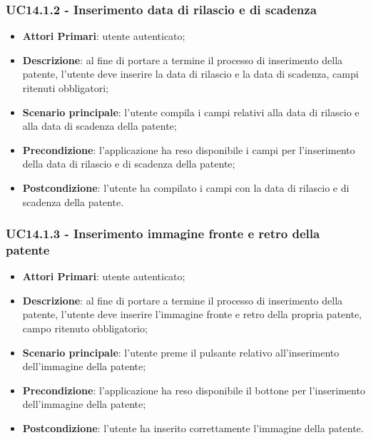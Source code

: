 \subsubsection{UC14.1.2 - Inserimento data di rilascio e di scadenza}
\begin{itemize}
	\item \textbf{Attori Primari}: utente autenticato;
	\item \textbf{Descrizione}: al fine di portare a termine il processo di inserimento della patente, l'utente deve inserire la data di rilascio e la data di scadenza, campi ritenuti obbligatori; 
	\item \textbf{Scenario principale}: l'utente compila i campi relativi alla data di rilascio e alla data di scadenza della patente;	
	\item \textbf{Precondizione}: l'applicazione ha reso disponibile i campi per l'inserimento della data di rilascio e di scadenza della patente;
	\item \textbf{Postcondizione}: l'utente ha compilato i campi con la data di rilascio e di scadenza della patente.
\end{itemize}
\subsubsection{UC14.1.3 - Inserimento immagine fronte e retro della patente}
\begin{itemize}
	\item \textbf{Attori Primari}: utente autenticato;
	\item \textbf{Descrizione}: al fine di portare a termine il processo di inserimento della patente, l'utente deve inserire l'immagine fronte e retro della propria patente, campo ritenuto obbligatorio; 
	\item \textbf{Scenario principale}: l'utente preme il pulsante relativo all'inserimento dell'immagine della patente;	
	\item \textbf{Precondizione}: l'applicazione ha reso disponibile il bottone per l'inserimento dell'immagine della patente;
	\item \textbf{Postcondizione}: l'utente ha inserito correttamente l'immagine della patente.
\end{itemize}
